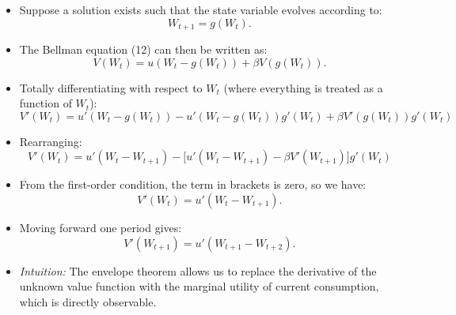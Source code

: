 \documentclass[12pt]{article}
\begin{document}
\begin{itemize}
    \item Suppose a solution exists such that the state variable evolves according to:
    \[
    W_{t+1} = g(W_t).
    \]

    \item The Bellman equation (12) can then be written as:
    \[
    V(W_t) = u(W_t - g(W_t)) + \beta V(g(W_t)).
    \]

    \item Totally differentiating with respect to \( W_t \) (where everything is treated as a function of \( W_t \)):
    \[
    V'(W_t) = u'(W_t - g(W_t)) - u'(W_t - g(W_t)) g'(W_t) + \beta V'(g(W_t)) g'(W_t)
    \]

    \item Rearranging:
    \[
    V'(W_t) = u'(W_t - W_{t+1}) - \big[ u'(W_t - W_{t+1}) - \beta V'(W_{t+1}) \big] g'(W_t)
    \]

    \item From the first-order condition, the term in brackets is zero, so we have:
    \[
    V'(W_t) = u'(W_t - W_{t+1}).
    \]

    \item Moving forward one period gives:
    \[
    V'(W_{t+1}) = u'(W_{t+1} - W_{t+2}).
    \]

    \item \textit{Intuition:} The envelope theorem allows us to replace the derivative of the unknown value function with the marginal utility of current consumption, which is directly observable.
\end{itemize}
\end{document}
